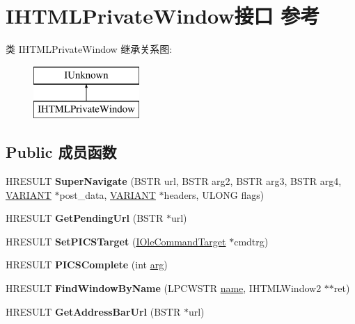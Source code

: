\hypertarget{interface_i_h_t_m_l_private_window}{}\section{I\+H\+T\+M\+L\+Private\+Window接口 参考}
\label{interface_i_h_t_m_l_private_window}
类 I\+H\+T\+M\+L\+Private\+Window 继承关系图\+:\begin{figure}[H]
\begin{center}
\leavevmode
\includegraphics[height=2.000000cm]{interface_i_h_t_m_l_private_window}
\end{center}
\end{figure}
\subsection*{Public 成员函数}
\begin{DoxyCompactItemize}
\item 
\mbox{\label{interface_i_h_t_m_l_private_window_aa77ecb27f0d7586773e9bb18d3c51d73}} 
H\+R\+E\+S\+U\+LT {\bfseries Super\+Navigate} (B\+S\+TR url, B\+S\+TR arg2, B\+S\+TR arg3, B\+S\+TR arg4, \hyperlink{structtag_v_a_r_i_a_n_t}{V\+A\+R\+I\+A\+NT} $\ast$post\+\_\+data, \hyperlink{structtag_v_a_r_i_a_n_t}{V\+A\+R\+I\+A\+NT} $\ast$headers, U\+L\+O\+NG flags)
\item 
\mbox{\label{interface_i_h_t_m_l_private_window_ac2aad7478b8ac51471c1e7c2f467475c}} 
H\+R\+E\+S\+U\+LT {\bfseries Get\+Pending\+Url} (B\+S\+TR $\ast$url)
\item 
\mbox{\label{interface_i_h_t_m_l_private_window_a8528527cbe61be812df74eb5b95f7234}} 
H\+R\+E\+S\+U\+LT {\bfseries Set\+P\+I\+C\+S\+Target} (\hyperlink{interface_i_ole_command_target}{I\+Ole\+Command\+Target} $\ast$cmdtrg)
\item 
\mbox{\label{interface_i_h_t_m_l_private_window_a0e6243cabbd568ceb5eec456cbc46443}} 
H\+R\+E\+S\+U\+LT {\bfseries P\+I\+C\+S\+Complete} (int \hyperlink{interfacevoid}{arg})
\item 
\mbox{\label{interface_i_h_t_m_l_private_window_ae6ae96c99f35e563fe959685bfe21ce0}} 
H\+R\+E\+S\+U\+LT {\bfseries Find\+Window\+By\+Name} (L\+P\+C\+W\+S\+TR \hyperlink{structname}{name}, I\+H\+T\+M\+L\+Window2 $\ast$$\ast$ret)
\item 
\mbox{\label{interface_i_h_t_m_l_private_window_abff7adcf18fd8c3b532a62c63aee69e4}} 
H\+R\+E\+S\+U\+LT {\bfseries Get\+Address\+Bar\+Url} (B\+S\+TR $\ast$url)
\end{DoxyCompactItemize}
